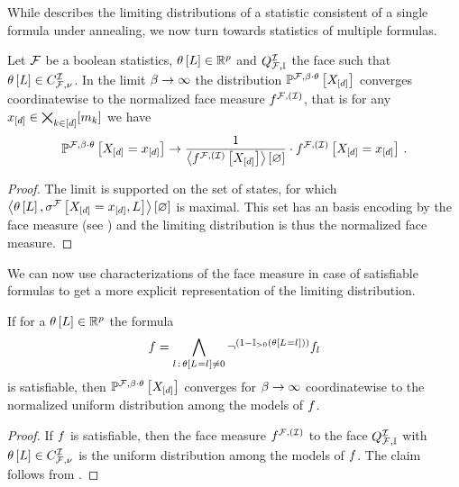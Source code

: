 \label{sec:hardLogicLimit}

While  describes the limiting distributions of a statistic consistent of a single formula under annealing, we now turn towards statistics of multiple formulas.

\begin{theorem}
    \label{the:limitingDistribution}
    Let $\mathcal{F}$ be a boolean statistics, $\theta\left[L\right]\in\mathbb{R}^{p}$ and $Q^{\mathcal{I}}_{\mathcal{F},\mathbb{I}}$ the face such that $\theta\left[L\right]\in C_{\mathcal{F},\nu}^{\mathcal{I}}$.
    In the limit $\beta\rightarrow\infty$ the distribution $\mathbb{P}^{\mathcal{F},\beta\cdot\theta}\left[X_{[d]}\right]$ converges coordinatewise to the normalized face measure $f^{\mathcal{F},(\mathcal{I})}$, that is for any $x_{[d]}\in\bigtimes_{k\in[d]}[m_{k}]$ we have
    \begin{align*}
        \mathbb{P}^{\mathcal{F},\beta\cdot\theta}\left[X_{[d]}=x_{[d]}\right]
        \rightarrow \frac{1}{\left\langle f^{\mathcal{F},(\mathcal{I})}\left[X_{[d]}\right]\right\rangle \left[ \varnothing \right]} \cdot f^{\mathcal{F},(\mathcal{I})}\left[X_{[d]}=x_{[d]}\right] \, .
    \end{align*}
\end{theorem}
\begin{proof}
    The limit is supported on the set of states, for which $\left\langle \theta\left[L\right],\sigma^{\mathcal{F}}\left[X_{[d]}=x_{[d]},L\right]\right\rangle \left[ \varnothing \right]$ is maximal.
    This set has an basis encoding by the face measure (see ) and the limiting distribution is thus the normalized face measure.
\end{proof}

We can now use characterizations of the face measure in case of satisfiable formulas to get a more explicit representation of the limiting distribution.

\begin{theorem}
    If for a $\theta\left[L\right]\in\mathbb{R}^{p}$ the formula
    \begin{align*}
        f =
        \bigwedge_{l\,:\,\theta\left[L_{}=l_{}\right]\neq0} \lnot^{(1-\mathbb{I}_{>0}\left(\theta\left[L_{}=l_{}\right]\right))} f_{l}
    \end{align*}
    is satisfiable, then $\mathbb{P}^{\mathcal{F},\beta\cdot\theta}\left[X_{[d]}\right]$ converges for $\beta\rightarrow\infty$ coordinatewise to the normalized uniform distribution among the models of $f$.
\end{theorem}
\begin{proof}
    If $f$ is satisfiable, then the face measure $f^{\mathcal{F},(\mathcal{I})}$ to the face $Q^{\mathcal{I}}_{\mathcal{F},\mathbb{I}}$ with $\theta\left[L\right]\in C_{\mathcal{F},\nu}^{\mathcal{I}}$ is the uniform distribution among the models of $f$.
    The claim follows from .
\end{proof}

